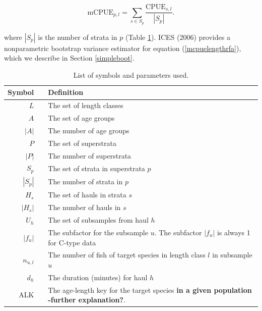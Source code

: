\documentclass[a4paper 12pt]{article}
\numberwithin{equation}{section}
\begin{document}
\begin{equation}
\mathrm{mCPUE}_{p,l} = \sum\limits_{s \in S_{p}} \frac{\mathrm{CPUE}_{s,l}}{|S_{p}|}.
\label{mcpuelengthrfa}
\end{equation}

where $|S_{p}|$ is the number of strata in $p$ (Table \ref{symbols}). ICES (2006) provides a nonparametric bootstrap variance estimator for equation (\ref{mcpuelengthrfa}), which we describe in Section \ref{simpleboot}. \\

\begin{table}[h!]
\centering
\caption{List of symbols and parameters used.}
\label{symbols}
\begin{tabularx}{\linewidth}{r l X}
\toprule 
Symbol   	&  & Definition                  \\[0.7ex]
\midrule
$L$        	&  & The set of length classes    \\[0.7ex]
$A$        	&  & The set of age groups       \\[0.7ex]
$|A|$      	&  & The number of age groups    \\[0.7ex]
$P$        	&  & The set of superstrata      \\[0.7ex]
$|P|$       &  & The number of superstrata   \\[0.7ex]
$S_{p}$     &  & The set of strata in superstrata $p$  \\[0.7ex]
$|S_{p}|$   &  & The number of strata in $p$  \\[0.7ex]
$H_{s}$     &  & The set of hauls in strata $s$  \\[0.7ex]
$|H_{s}|$   &  & The number of hauls in $s$  \\[0.7ex]
$U_{h}$     &  & The set of subsamples from haul $h$  \\[0.7ex]
$|f_{u}|$   &  & The subfactor for the subsample $u$. The subfactor $|f_{u}|$ is always 1 for C-type data  \\[0.7ex]
$n_{u,l}$   &  & The number of fish of target species in length class $l$ in subsample $u$  \\[0.7ex]
$d_{h}$   &  & The duration (minutes) for haul $h$  \\[0.7ex]
ALK  & & The age-length key for the target species {\bf in a given population -further explanation?}.\\
\bottomrule         
\end{tabularx}
\end{table}
\end{document}
